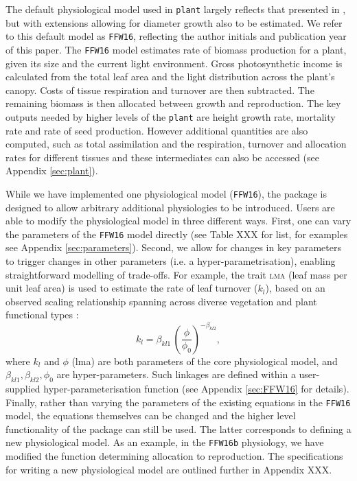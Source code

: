\documentclass[a4paper,11pt]{article}
\newcommand{\plant}{\texttt{plant}}
\begin{document}
The default physiological model used in {\plant} largely reflects
that presented in \citet{Falster-2011,Falster-2015}, but with extensions
allowing for diameter growth also to be estimated. We refer to this
default model as \texttt{FFW16}, reflecting the author initials and
publication year of this paper. The \texttt{FFW16} model estimates rate
of biomass
production for a plant, given its size and the current light
environment. Gross photosynthetic income is calculated from the total
leaf area and the light distribution across the plant's canopy. Costs
of tissue respiration and turnover are then subtracted. The remaining
biomass is then allocated between growth and reproduction. The key
outputs needed by higher levels of the {\plant} are height
growth rate, mortality rate and rate of seed production.  However
additional quantities are also computed, such as total assimilation
and the respiration, turnover and allocation rates for different
tissues and these intermediates can also be accessed (see Appendix
\ref{sec:plant}).

While we have implemented one physiological model (\texttt{FFW16}), the
package is designed to allow arbitrary additional physiologies to be
introduced. Users are able to modify the physiological model in three
different ways. First, one can vary the parameters of the \texttt{FFW16} model
directly (see Table XXX for list, for examples see Appendix
\ref{sec:parameters}). Second, we allow for changes in key parameters to
trigger changes in other parameters (i.e. a hyper-parametrisation), enabling
straightforward modelling of trade-offs. For example, the trait \textsc{lma}
(leaf mass per unit leaf area) is used to estimate the rate of leaf turnover
($k_l$), based on an observed scaling relationship spanning across diverse
vegetation and plant functional types \citep{Wright-2004}:
$$k_l = \beta_{kl1} \, \left(\frac{\phi}{\phi_0}\right)^{-\beta_{kl2}},$$ 
where $k_l$ and $\phi$ (lma) are both parameters of the core physiological
model, and $\beta_{kl1}, \beta_{kl2}, \phi_0$ are hyper-parameters. Such
linkages are defined within a user-supplied hyper-parameterisation function
(see Appendix \ref{sec:FFW16} for details). Finally, rather than varying the
parameters of the existing equations in the \texttt{FFW16} model, the
equations themselves can be changed and the higher level functionality of the
package can still be used.  The latter corresponds to defining a new
physiological model. As an example, in the \texttt{FFW16b} physiology, we have modified
the function determining allocation to reproduction. The specifications
for writing a new physiological model are outlined further in Appendix 
XXX.
\end{document}

